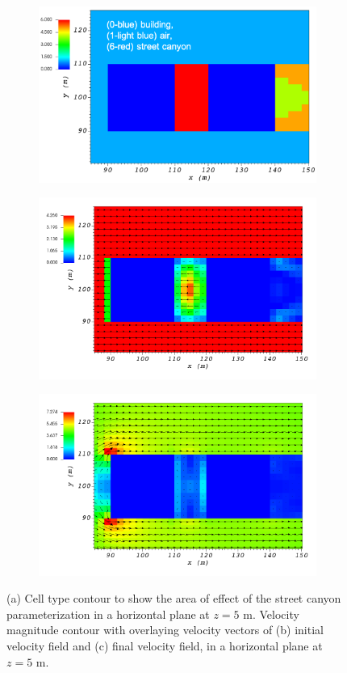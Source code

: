 \begin{figure}[H]
    \centering
    \begin{subfigure}{\textwidth}
    \centering
    \includegraphics[width=10.3cm,keepaspectratio]{Images/street_z_5_1_init_icell.png}
    \caption{}
    \end{subfigure}
    \begin{subfigure}{\textwidth}
    \centering
    \includegraphics[width=11.0cm,keepaspectratio]{Images/street_z_5_1_init_vel.png}
    \caption{}
    \end{subfigure}
    \begin{subfigure}{\textwidth}
    \centering
    \includegraphics[width=11.0cm,keepaspectratio]{Images/street_z_5_1_final.png}
    \caption{}
    \end{subfigure}
    \caption{(a) Cell type contour to show the area of effect of the street canyon parameterization in a horizontal plane at $z=5$ m. Velocity magnitude contour with overlaying velocity vectors of (b) initial velocity field and (c) final velocity field, in a horizontal plane at $z=5$ m.}
\end{figure}

